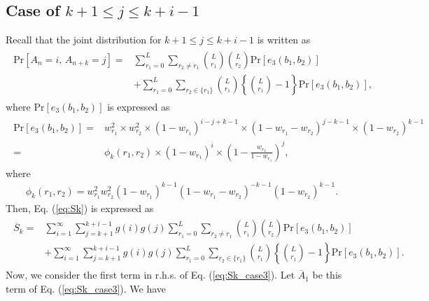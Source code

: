 \subsection{Case of $k+1 \leq j \leq k+i-1$}
Recall that the joint distribution for $k+1 \leq j \leq k+i-1$ is written as
\begin{align}\begin{split}
	\mathrm{Pr}[A_n=i,\, A_{n+k}=j] 
	=& \sum_{r_1=0}^{L} \sum_{r_2 \neq r_1} \binom{L}{r_1}\binom{L}{r_2}\mathrm{Pr}[e_3(b_1,b_2)] \\
	&+ \sum_{r_1=0}^{L} \sum_{r_2 \in \{r_1\}} \binom{L}{r_1}\left\{\binom{L}{r_1}-1\right\}\mathrm{Pr}[e_3(b_1,b_2)],
\end{split}\end{align}
where $\mathrm{Pr}[e_3(b_1,b_2)]$ is expressed as
\begin{align}\begin{split}
	\mathrm{Pr}[e_3(b_1,b_2)]
  =& w_{r_1}^2  \times w_{r_2}^2 
  \times (1-w_{r_1})^{i-j+k-1} 
  \times (1-w_{r_1}-w_{r_2})^{j-k-1}
  \times (1-w_{r_2})^{k-1} \\
  =&\phi_k(r_1,r_2)\times (1-w_{r_1})^{i} \times \left(1-\frac{w_{r_2}}{1-w_{r_1}} \right)^{j},
\end{split}\end{align}
%
where
\begin{align}\label{eq:phi_k}
	\phi_k(r_1,r_2) = w_{r_1}^2 w_{r_2}^2 
  	(1-w_{r_1})^{k-1} 
  	(1-w_{r_1}-w_{r_2})^{-k-1}
  	(1-w_{r_2})^{k-1}.
\end{align}
%
Then, Eq. (\ref{eq:Sk}) is expressed as
\begin{align}\begin{split}\label{eq:Sk_case3}
	\overline{S}_k 
	=& \sum_{i=1}^{\infty}\sum_{j=k+1}^{k+i-1} g(i)g(j) \sum_{r_1=0}^{L} \sum_{r_2 \neq r_1} \binom{L}{r_1}\binom{L}{r_2}\mathrm{Pr}[e_3(b_1,b_2)]\\ 
	&+ \sum_{i=1}^{\infty}\sum_{j=k+1}^{k+i-1} g(i)g(j) \sum_{r_1=0}^{L} \sum_{r_2 \in \{r_1\}} \binom{L}{r_1} \left\{\binom{L}{r_1}-1 \right\}\mathrm{Pr}[e_3(b_1,b_2)].
\end{split}\end{align}
%
Now, we consider the first term in r.h.s. of Eq. (\ref{eq:Sk_case3}). Let $\overline{A}_1$ be this term of Eq. (\ref{eq:Sk_case3}). We have
